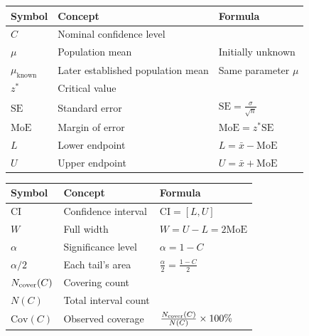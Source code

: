 \begingroup
\small
\setlength{\tabcolsep}{3pt}
\setlength{\extrarowheight}{0pt}
\setlength{\parskip}{0pt}
\renewcommand{\arraystretch}{1}
\noindent\begin{minipage}[t]{.49\linewidth}
\vspace{0pt}
\begin{tabularx}{\linewidth}{@{}>{\raggedright\arraybackslash}p{.21\linewidth}>{\raggedright\arraybackslash}p{.34\linewidth}>{\raggedright\arraybackslash}X@{}}
\toprule
\textbf{Symbol} & \textbf{Concept} & \textbf{Formula} \\
\midrule
$C$ & Nominal confidence level & \\
$\mu$ & Population mean & Initially unknown \\
$\mu_{\mathrm{known}}$ & Later established population mean & Same parameter $\mu$ \\
$z^*$ & Critical value & \\
$\mathrm{SE}$ & Standard error & $\mathrm{SE}=\frac{\sigma}{\sqrt n}$ \\
$\mathrm{MoE}$ & Margin of error & $\mathrm{MoE}=z^*\mathrm{SE}$ \\
$L$ & Lower endpoint & $L=\bar{x}-\mathrm{MoE}$ \\
$U$ & Upper endpoint & $U=\bar{x}+\mathrm{MoE}$ \\
\bottomrule
\end{tabularx}\par
\end{minipage}\hfill
\begin{minipage}[t]{.49\linewidth}
\vspace{0pt}
\begin{tabularx}{\linewidth}{@{}>{\raggedright\arraybackslash}p{.21\linewidth}>{\raggedright\arraybackslash}p{.34\linewidth}>{\raggedright\arraybackslash}X@{}}
\toprule
\textbf{Symbol} & \textbf{Concept} & \textbf{Formula} \\
\midrule
$\mathrm{CI}$ & Confidence interval & $\mathrm{CI}=[L,U]$ \\
$W$ & Full width & $W=U-L=2\mathrm{MoE}$ \\
$\alpha$ & Significance level & $\alpha=1-C$ \\
$\alpha/2$ & Each tail's area & $\frac{\alpha}{2}=\frac{1-C}{2}$ \\
$N_{\rm cover}(C)$ & Covering count & \\
$N(C)$ & Total interval count & \\
$\mathrm{Cov}(C)$ & Observed coverage & $\frac{N_{\rm cover}(C)}{N(C)}\times100\%$ \\
\bottomrule
\end{tabularx}\par
\end{minipage}\par
